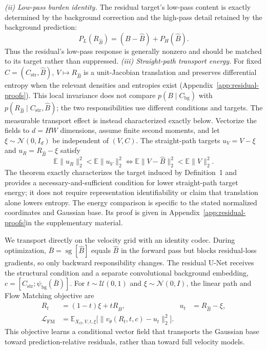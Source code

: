 \textit{(ii) Low-pass burden identity.}
The residual target's low-pass content is exactly determined by the background correction and the high-pass detail retained by the background prediction:
\begin{equation}
P_L(R_{\hat B})=(B-\hat B)+P_H(\hat B).
\label{eq:low-frequency-burden}
\end{equation}
Thus the residual's low-pass response is generally nonzero and should be matched to its target rather than suppressed.
\textit{(iii) Straight-path transport energy.}
For fixed $C=(C_{\mathrm{str}},\hat B)$, $V\mapsto R_{\hat B}$ is a unit-Jacobian translation and preserves differential entropy when the relevant densities and entropies exist (Appendix~\ref{app:residual-proofs}). This local invariance does not compare $p(B\mid C_{\mathrm{bg}})$ with $p(R_{\hat B}\mid C_{\mathrm{str}},\hat B)$; the two responsibilities use different conditions and targets. The measurable transport effect is instead characterized exactly below. Vectorize the fields to $d=HW$ dimensions, assume finite second moments, and let $\xi\sim\mathcal N(0,I_d)$ be independent of $(V,C)$. The straight-path targets $u_V=V-\xi$ and $u_R=R_{\hat B}-\xi$ satisfy
\begin{equation}
\mathbb E\|u_R\|_2^2<\mathbb E\|u_V\|_2^2
\iff
\mathbb E\|V-\hat B\|_2^2<\mathbb E\|V\|_2^2.
\label{eq:transport-condition}
\end{equation}
The theorem exactly characterizes the target induced by Definition~1 and provides a necessary-and-sufficient condition for lower straight-path target energy; it does not require representation identifiability or claim that translation alone lowers entropy. The energy comparison is specific to the stated normalized coordinates and Gaussian base. Its proof is given \ifaaaiwithappendix in Appendix~\ref{app:residual-proofs}\else in the supplementary material\fi.

We transport directly on the velocity grid with an identity codec. During optimization, $\bar B=\operatorname{sg}[\hat B]$ equals $\hat B$ in the forward pass but blocks residual-loss gradients, so only backward responsibility changes. The residual U-Net receives the structural condition and a separate convolutional background embedding, $c=[C_{\mathrm{str}};\psi_{\mathrm{bg}}(\bar B)]$. For $t\sim\mathcal U(0,1)$ and $\xi\sim\mathcal N(0,I)$, the linear path and Flow Matching objective are
\begin{equation}
\begin{aligned}
R_t&=(1-t)\xi+tR_{\hat B},&
u_t&=R_{\hat B}-\xi,\\
\mathcal L_{\mathrm{FM}}
&=\mathbb E_{X_\Omega,V,t,\xi}
\bigl[\|v_\theta(R_t,t,c)-u_t\|_2^2\bigr].
\end{aligned}
\label{eq:fm-objective}
\end{equation}
This objective learns a conditional vector field that transports the Gaussian base toward prediction-relative residuals, rather than toward full velocity models.

